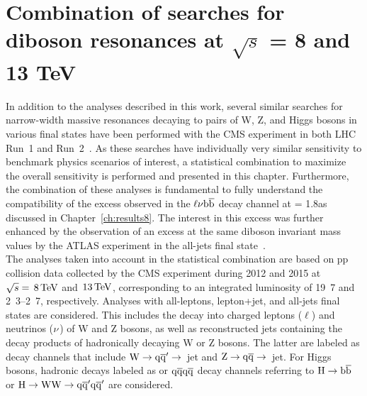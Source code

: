 \chapter{Combination of searches for diboson resonances at $\sqrt{s}$ = 8 and 13 TeV}
\label{ch:combination}

In addition to the analyses described in this work, several similar searches for narrow-width massive resonances decaying to pairs of W, Z, and Higgs bosons in various final states have been performed with the CMS experiment in both LHC Run~1 and Run~2~\cite{CMS-PAS-EXO-15-002,Khachatryan:2016cfx,Khachatryan:2014gha, Khachatryan:2014hpa, Khachatryan:2015bma, Khachatryan:2014xja,Khachatryan:2016yji,Khachatryan:2015ywa}.
As these searches have individually very similar sensitivity to benchmark physics scenarios of interest, a statistical combination to maximize the overall sensitivity is performed and presented in this chapter.
Furthermore, the combination of these analyses is fundamental to fully understand the compatibility of the excess observed in the $\ell\nu{\mathrm{b}\overline{\mathrm{b}}}$ decay channel at \mWH = 1.8\TeV as discussed in Chapter~\ref{ch:results8}.
The interest in this excess was further enhanced by the observation of an excess at the same diboson invariant mass values by the ATLAS experiment in the all-jets final state~\cite{Aad:2015owa}.\\

The analyses taken into account in the statistical combination are based on pp collision data collected by the CMS experiment during 2012 and 2015 at $\sqrt{s} = \text{\,8}{\ensuremath{\,\text{Te\hspace{-.08em}V}}}$ and $\text{\,13}{\ensuremath{\,\text{Te\hspace{-.08em}V}}}$, corresponding to an integrated luminosity of \unit{19.7}{\fbinv} and \unit{2.3}--\unit{2.7}{\fbinv}, respectively.
Analyses with all-leptons, lepton+jet, and all-jets final states are considered. This includes the decay into charged leptons ($\ell$) and neutrinos ($\nu$) of W and Z bosons, as well as reconstructed jets containing the decay products of hadronically decaying W or Z bosons. The latter are labeled as \qqbar decay channels that include $\rm W\to\mathrm{q}\overline{\mathrm{q}}'\to$~jet and $\rm Z\to\mathrm{q}\overline{\mathrm{q}}\to$~jet. For Higgs bosons, hadronic decays labeled as \bbbar or $\mathrm{q}\overline{\mathrm{q}}\mathrm{q}\overline{\mathrm{q}}$ decay channels referring to $\mathrm{H}\to{\mathrm{b}\overline{\mathrm{b}}}$ or $\mathrm{H}\to\mathrm{W}\mathrm{W}\to\mathrm{q}\overline{\mathrm{q}}^\prime\mathrm{q}\overline{\mathrm{q}}^\prime$ are considered.

